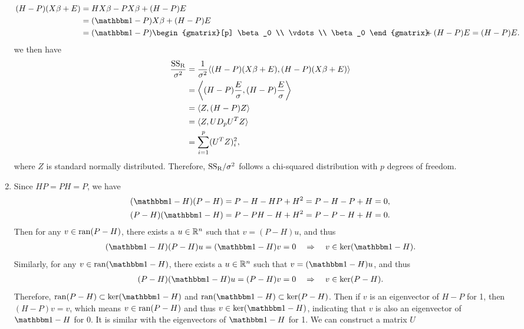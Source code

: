 \begin{enumerate}
\begin{align*}
	(H-P)(X\beta + E) & = HX\beta - PX\beta + (H-P)E \\
	& = (\bbone - P)X\beta + (H-P)E \\
	& = (\bbone - P)\begin{gmatrix}[p]
	\beta_0  \\
	\vdots  \\
	\beta_0 
	\end{gmatrix}\!\!\!\! + (H-P)E = (H-P)E.
	\end{align*}
	we then have
	\begin{align*}
	\frac{\mathrm{SS_R}}{\sigma^2} & = \frac{1}{\sigma^2}\langle (H-P)(X\beta + E), (H-P)(X\beta + E)\rangle \\
	& =  \left\langle (H-P)\frac{E}{\sigma}, (H-P)\frac{E}{\sigma}\right\rangle \\
	& = \langle Z, (H-P)Z\rangle \\
	& = \langle Z, UD_pU^T Z\rangle  \\
	& = \sum_{i=1}^{p} (U^TZ)_i^2,
	\end{align*}
	where $Z$ is standard normally distributed. Therefore, $\mathrm{SS_R}/\sigma^2$ follows a chi-squared distribution with $p$ degrees of freedom.
	\item Since $HP = PH = P$, we have
	\begin{align*}
	(\bbone - H)(P - H) & = P - H - HP + H^2 = P - H - P + H = 0, \\
	(P - H)(\bbone - H) & = P - PH - H + H^2 = P - P - H + H = 0.
	\end{align*}
	Then for any $v\in \mathrm{ran}(P - H)$, there exists a $u\in \mathbb{R}^n$ such that $v = (P-H)u$, and thus
	\begin{align*}
	(\bbone - H)(P - H)u = (\bbone - H)v = 0\quad\Rightarrow\quad v\in \U{ker}(\bbone - H).
	\end{align*}
	Similarly, for any $v\in \U{ran}(\bbone - H)$, there exists a $u\in \mathbb{R}^n$ such that $v = (\bbone - H)u$, and thus
	\begin{align*}
	(P - H)(\bbone - H)u = (P - H)v = 0\quad\Rightarrow\quad v\in \U{ker}(P - H).
	\end{align*}
	Therefore, $\U{ran}(P - H)\subset\U{ker}(\bbone - H)$ and $\U{ran}(\bbone - H)\subset \U{ker}(P - H)$. Then if $v$ is an eigenvector of $H-P$ for 1, then $(H-P)v = v$, which means $v\in \mathrm{ran}(P-H)$ and thus $v\in \U{ker}(\bbone-H)$, indicating that $v$ is also an eigenvector of $\bbone-H$ for 0. It is similar with the eigenvectors of $\bbone-H$ for 1. We can construct a matrix $U$ 
	\begin{align*}

\end{align*}
\end{enumerate}

